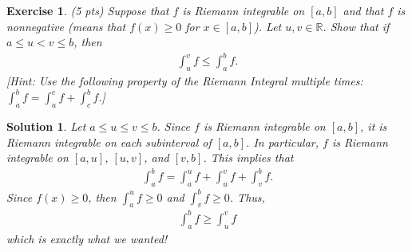 \documentclass[12pt]{article}
\newcommand{\bR}{\mathbb{R}}
\theoremstyle{plain}
\newtheorem{exer}{\textbf{Exercise}}}
\theoremstyle{plain}
\newtheorem*{sol}{\textbf{Solution}}}
\theoremstyle{plain}
\theoremstyle{plain}
\begin{document}
\begin{exer}
(5 pts)
Suppose that $f$ is Riemann integrable on $[a, b]$ and that $f$ is nonnegative (means that $f(x) \geq 0$ for $x \in [a, b]$). Let $u, v \in \bR$. Show that if $a \leq u < v \leq b$, then
	\begin{align*}
	\int_u^v f \leq \int_a^b f .
	\end{align*}
[Hint: Use the following property of the Riemann Integral multiple times: $\int_a^b f = \int_a^c f + \int_c^b f$.]
\end{exer}
\begin{sol}
Let $a \leq u \leq v \leq b$. Since $f$ is Riemann integrable on $[a, b]$, it is Riemann integrable on each subinterval of $[a, b]$. In particular, $f$ is Riemann integrable on $[a, u]$, $[u, v]$, and $[v, b]$. This implies that
	\begin{align*}
	\int_a^b f = \int_a^u f + \int_u^v f + \int_v^b f .
	\end{align*}
Since $f(x) \geq 0$, then $\int_a^u f \geq 0$ and $\int_v^b f \geq 0$. Thus, 
	\begin{align*}
	\int_a^b f \geq \int_u^v f 
	\end{align*}
which is exactly what we wanted!
\end{sol}
\end{document}
